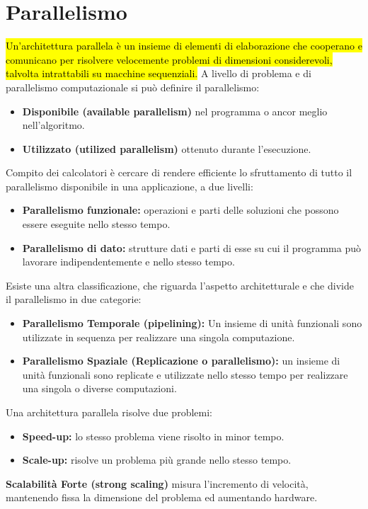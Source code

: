 \documentclass{article}
\begin{document}
\section{Parallelismo}
\hl{Un’architettura parallela è un insieme di elementi di elaborazione che
cooperano e comunicano per risolvere velocemente problemi di dimensioni considerevoli,
talvolta intrattabili su macchine sequenziali.}
A livello di problema e di parallelismo computazionale si può definire il parallelismo:
\begin{itemize}
    \item \textbf{Disponibile (available parallelism)} nel programma o ancor meglio nell’algoritmo.
    \item \textbf{Utilizzato (utilized parallelism)} ottenuto durante l’esecuzione.
\end{itemize}
Compito dei calcolatori è cercare di rendere efficiente lo sfruttamento di tutto il parallelismo
disponibile in una applicazione, a due livelli:
\begin{itemize}
    \item \textbf{Parallelismo funzionale:} operazioni e parti delle soluzioni che possono essere eseguite nello stesso tempo.
    \item \textbf{Parallelismo di dato:} strutture dati e parti di esse su cui il programma può lavorare indipendentemente e nello stesso tempo.
\end{itemize}
Esiste una altra classificazione, che riguarda l’aspetto architetturale e che divide il parallelismo in due categorie:
\begin{itemize}
    \item \textbf{ Parallelismo Temporale (pipelining):} Un insieme di unità funzionali sono utilizzate in sequenza per realizzare una singola computazione.
    \item \textbf{Parallelismo Spaziale (Replicazione o parallelismo):} un insieme di unità funzionali sono replicate e utilizzate nello stesso tempo per realizzare una singola o diverse computazioni.
\end{itemize}
Una architettura parallela risolve due problemi:
\begin{itemize}
    \item \textbf{Speed-up:} lo stesso problema viene risolto in minor tempo.
    \item \textbf{Scale-up:} risolve un problema più grande nello stesso tempo.
\end{itemize}
\textbf{Scalabilità Forte (strong scaling)} misura l’incremento di velocità, mantenendo fissa la dimensione del problema ed aumentando hardware.\\
\end{document}
